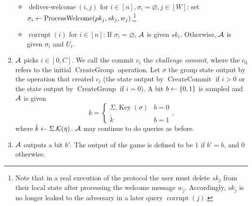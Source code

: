 \begin{definition}
\begin{enumerate}[1.]
\begin{itemize}
			      \item $\operatorname{deliver-welcome}(i, j)$ for $i \in [n], \sigma_i = \varnothing, j \in [W]$: set $\sigma_i \leftarrow \operatorname{ProcessWelcome}(pk_j, sk_j, w_j)$.\footnote{Note that in a real execution of the protocol the user must delete $sk_j$ from their local state after processing the welcome message $w_j$. Accordingly, $sk_j$ is no longer leaked to the adversary in a later query $\operatorname{corrupt}(j)$.}
			      \item $\operatorname{corrupt}(i)$ for $i \in [n]$: If $\sigma_i = \varnothing$, $\mathcal{A}$ is given $sk_i$. Otherwise, $\mathcal{A}$ is given $\sigma_i$ and $U_i$.
		      \end{itemize}
		\item $\mathcal{A}$ picks $i \in [0, C]$. We call the commit $c_i$ the \emph{challenge commit}, where the $c_0$ refers to the initial $\operatorname{CreateGroup}$ operation. Let $\sigma$ the group state output by the operation that created $c_i$ (the state output by $\operatorname{CreateCommit}$ if $i > 0$ or the state output by $\operatorname{CreateGroup}$ if $i = 0$). A bit $b \leftarrow \{0, 1\}$ is sampled and $\mathcal{A}$ is given
		      \[
			      k = \begin{cases}
				      \Sigma.\operatorname{Key}(\sigma) & b = 0 \\
				      \tilde{k}                         & b = 1
			      \end{cases},
		      \]
		      where $\tilde{k} \leftarrow \Sigma.\mathcal{K}(\eta)$. $\mathcal{A}$ may continue to do queries as before.
		\item $\mathcal{A}$ outputs a bit $b'$. The output of the game is defined to be $1$ if $b' = b$, and $0$ otherwise.
	\end{enumerate}


\end{definition}
